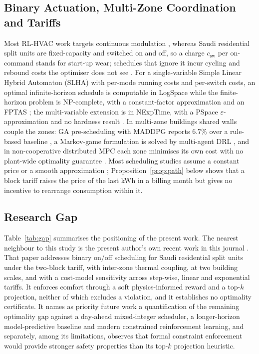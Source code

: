 \documentclass[pdflatex,sn-mathphys-num,iicol]{sn-jnl}
\theoremstyle{thmstyleone}\newtheorem{proposition}{Proposition}\newtheorem{corollary}{Corollary}
\theoremstyle{thmstyletwo}\newtheorem{remark}{Remark}\newtheorem{observation}{Observation}
\theoremstyle{thmstylethree}\newtheorem{definition}{Definition}
\newcommand{\csw}{c_{\mathrm{sw}}}
\begin{document}
\subsection{Binary Actuation, Multi-Zone Coordination and Tariffs}

Most RL-HVAC work targets continuous modulation \citep{Wang2024DRL}, whereas Saudi residential split units are fixed-capacity and switched on and off, so a charge $\csw$ per on-command stands for start-up wear; schedules that ignore it incur cycling and rebound costs the optimiser does not see \citep{Faddel2023}. For a single-variable Simple Linear Hybrid Automaton (SLHA) with per-mode running costs and per-switch costs, an optimal infinite-horizon schedule is computable in LogSpace while the finite-horizon problem is NP-complete, with a constant-factor approximation and an FPTAS \citep{Mousa2016}; the multi-variable extension is in NExpTime, with a PSpace $\varepsilon$-approximation and no hardness result \citep{Mousa2017}. In multi-zone buildings shared walls couple the zones: GA pre-scheduling with MADDPG reports $6.7\%$ over a rule-based baseline \citep{Xue2025}, a Markov-game formulation is solved by multi-agent DRL \citep{Yu2021}, and in non-cooperative distributed MPC each zone minimises its own cost with no plant-wide optimality guarantee \citep{Scattolini2009}. Most scheduling studies assume a constant price \citep{ElMakroum2023} or a smooth approximation \citep{Risbeck2017}; Proposition~\ref{prop:path} below shows that a block tariff raises the price of the last kWh in a billing month but gives no incentive to rearrange consumption within it.

\subsection{Research Gap}
\label{subsec:gap}
 
Table~\ref{tab:gap} summarises the positioning of the present work. The nearest neighbour to this study is the present author's own recent work in this journal \citep{Faraj2026}. That paper addresses binary on/off scheduling for Saudi residential split units under the two-block tariff, with inter-zone thermal coupling, at two building scales, and with a cost-model sensitivity across step-wise, linear and exponential tariffs. It enforces comfort through a soft physics-informed reward and a top-$k$ projection, neither of which excludes a violation, and it establishes no optimality certificate. It names as priority future work a quantification of the remaining optimality gap against a day-ahead mixed-integer scheduler, a longer-horizon model-predictive baseline and modern constrained reinforcement learning, and separately, among its limitations, observes that formal constraint enforcement would provide stronger safety properties than its top-$k$ projection heuristic.
\end{document}
